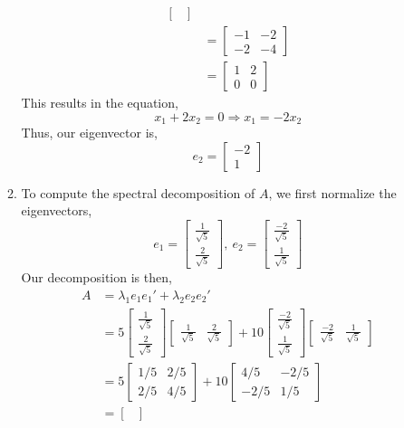 \documentclass[letterpaper,10pt]{article}
\begin{document}
\begin{enumerate}
\begin{enumerate}
\begin{align*}
\begin{bmatrix}
\end{bmatrix}\\
&=\begin{bmatrix}
-1 & -2\\ -2 & -4
\end{bmatrix}\\
&= \begin{bmatrix}
1 & 2\\ 0 & 0
\end{bmatrix}
\end{align*}
This results in the equation,
\[x_1+2x_2=0 \Rightarrow x_1=-2x_2\]
Thus, our eigenvector is,
\[e_2 = \begin{bmatrix}
-2\\1
\end{bmatrix}\]
\item To compute the spectral decomposition of $A$, we first normalize the eigenvectors,
\[e_1=\begin{bmatrix}
\frac{1}{\sqrt{5}}\\\frac{2}{\sqrt{5}}
\end{bmatrix},\ e_2=\begin{bmatrix}
\frac{-2}{\sqrt{5}}\\\frac{1}{\sqrt{5}}
\end{bmatrix} \]
Our decomposition is then,
\begin{align*}
A &= \lambda_1e_1e_1'+\lambda_2e_2e_2'\\
&=5\begin{bmatrix}
\frac{1}{\sqrt{5}}\\\frac{2}{\sqrt{5}}
\end{bmatrix}\begin{bmatrix}
\frac{1}{\sqrt{5}} & \frac{2}{\sqrt{5}}
\end{bmatrix}+10\begin{bmatrix}
\frac{-2}{\sqrt{5}}\\\frac{1}{\sqrt{5}}
\end{bmatrix}\begin{bmatrix}
\frac{-2}{\sqrt{5}} & \frac{1}{\sqrt{5}}
\end{bmatrix}\\
&=5 \begin{bmatrix}
1/5 & 2/5 \\
2/5 & 4/5
\end{bmatrix}+10\begin{bmatrix}
4/5 & -2/5\\
-2/5 & 1/5
\end{bmatrix}\\
&=\begin{bmatrix}

\end{bmatrix}
\end{align*}
\end{enumerate}
\end{enumerate}
\end{document}
